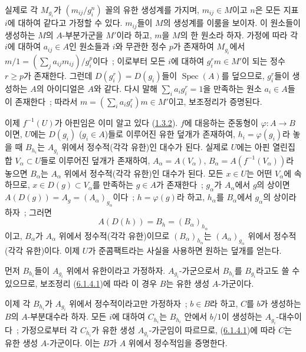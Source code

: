 실제로 각 $M_{g_i}$가 $(m_{ij}/g_i^n)$ 꼴의 유한 생성계를 가지며,
$m_{ij}\in M$이고 $n$은 모든 지표 $i$에 대하여 같다고 가정할 수 있다.
$m_{ij}$들이 $M$의 생성계를 이룸을 보이자. 이 원소들이 생성하는 $M$의
$A$-부분가군을 $M'$이라 하고, $m$을 $M$의 한 원소라 하자. 가정에 따라
각 $i$에 대하여 $a_{ij}\in A$인 원소들과 $i$와 무관한 정수 $p$가 존재하여
$M_{g_i}$에서
$m/1=(\sum_j a_{ij}m_{ij})/g_i^p$이다~; 이로부터 모든 $i$에 대하여
$g_i^r m\in M'$이 되는 정수 $r\geq p$가 존재한다. 그런데
$D(g_i^r)=D(g_i)$들이 $\operatorname{Spec}(A)$를 덮으므로, $g_i^r$들이
생성하는 $A$의 아이디얼은 $A$와 같다. 다시 말해
$\sum_i a_i g_i^r=1$을 만족하는 원소 $a_i\in A$들이 존재한다~; 따라서
$m=(\sum_i a_i g_i^r)m\in M'$이고, 보조정리가 증명된다.

이제 $f^{-1}(U)$가 아핀임은 이미 알고 있다
(\hyperref[II.1.3.2-ko]{1.3.2}). $f$에 대응하는 준동형이
$\varphi:A\to B$이면, $U$에는 $D(g_i)$ ($g_i\in A$)들로 이루어진 유한
덮개가 존재하여, $h_i=\varphi(g_i)$라 놓을 때 $B_{h_i}$는
$A_{g_i}$ 위에서 정수적(각각 유한)인 대수가 된다. 실제로 $U$에는 아핀
열린집합 $V_\alpha\subset U$들로 이루어진 덮개가 존재하여,
$A_\alpha=A(V_\alpha)$,
$B_\alpha=A(f^{-1}(V_\alpha))$라 놓으면 $B_\alpha$는 $A_\alpha$ 위에서
정수적(각각 유한)인 대수가 된다. 모든 $x\in U$는 어떤 $V_\alpha$에
속하므로, $x\in D(g)\subset V_\alpha$를 만족하는 $g\in A$가 존재한다~;
$g_\alpha$가 $A_\alpha$에서 $g$의 상이면
$A(D(g))=A_g=(A_\alpha)_{g_\alpha}$이다~; $h=\varphi(g)$라 하고,
$h_\alpha$를 $B_\alpha$에서 $g_\alpha$의 상이라 하자~; 그러면
\[
A(D(h))=B_h=(B_\alpha)_{h_\alpha}
\]
이고, $B_\alpha$가 $A_\alpha$ 위에서 정수적(각각 유한)이므로
$(B_\alpha)_{h_\alpha}$는 $(A_\alpha)_{g_\alpha}$ 위에서 정수적
(각각 유한)이다. 이제 $U$가 준콤팩트라는 사실을 사용하면 원하는 덮개를
얻는다.

먼저 $B_{h_i}$들이 $A_{g_i}$ 위에서 유한이라고 가정하자.
$A_{g_i}$-가군으로서 $B_{h_i}$를 $B_{g_i}$라고도 쓸 수 있으므로,
보조정리 (\hyperref[II.6.1.4.1-ko]{6.1.4.1})에 따라 이 경우 $B$는 유한
생성 $A$-가군이다.

이제 각 $B_{h_i}$가 $A_{g_i}$ 위에서 정수적이라고만 가정하자~;
$b\in B$라 하고, $C$를 $b$가 생성하는 $B$의 $A$-부분대수라 하자. 모든
$i$에 대하여 $C_{h_i}$는 $B_{h_i}$ 안에서 $b/1$이 생성하는
$A_{g_i}$-대수이다~; 가정으로부터 각 $C_{h_i}$가 유한 생성
$A_{g_i}$-가군임이 따르므로,
(\hyperref[II.6.1.4.1-ko]{6.1.4.1})에 따라 $C$는 유한 생성 $A$-가군이다.
이는 $B$가 $A$ 위에서 정수적임을 증명한다.


